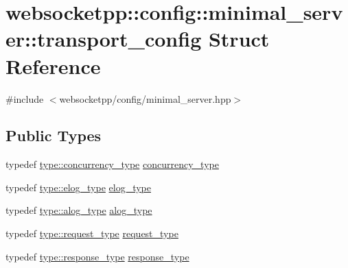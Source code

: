 \hypertarget{structwebsocketpp_1_1config_1_1minimal__server_1_1transport__config}{}\section{websocketpp\+:\+:config\+:\+:minimal\+\_\+server\+:\+:transport\+\_\+config Struct Reference}
\label{structwebsocketpp_1_1config_1_1minimal__server_1_1transport__config}


{\ttfamily \#include $<$websocketpp/config/minimal\+\_\+server.\+hpp$>$}

\subsection*{Public Types}
\begin{DoxyCompactItemize}
\item 
typedef \hyperlink{structwebsocketpp_1_1config_1_1minimal__server_a54e2bde35814bd82607f618aacd3ec88}{type\+::concurrency\+\_\+type} \hyperlink{structwebsocketpp_1_1config_1_1minimal__server_1_1transport__config_a753cbfdd821f9a6643ba8ee70d4834e6}{concurrency\+\_\+type}
\item 
typedef \hyperlink{structwebsocketpp_1_1config_1_1minimal__server_ab8a516661fb2ddd3a3c377823b623c1a}{type\+::elog\+\_\+type} \hyperlink{structwebsocketpp_1_1config_1_1minimal__server_1_1transport__config_a678324060123483e9513cbcd24829cba}{elog\+\_\+type}
\item 
typedef \hyperlink{structwebsocketpp_1_1config_1_1minimal__server_a9296068cfeabe4786e08691cd755f9b3}{type\+::alog\+\_\+type} \hyperlink{structwebsocketpp_1_1config_1_1minimal__server_1_1transport__config_a09acf498effc5c29b26e50a98ce2b8e9}{alog\+\_\+type}
\item 
typedef \hyperlink{structwebsocketpp_1_1config_1_1minimal__server_a7b07ee40c2b25c39fb8e333f969df8e3}{type\+::request\+\_\+type} \hyperlink{structwebsocketpp_1_1config_1_1minimal__server_1_1transport__config_ac45b02a9778ad3371ace822e80d43f8d}{request\+\_\+type}
\item 
typedef \hyperlink{structwebsocketpp_1_1config_1_1minimal__server_a19b0c06176d183a59e47bfe065b132ff}{type\+::response\+\_\+type} \hyperlink{structwebsocketpp_1_1config_1_1minimal__server_1_1transport__config_a5d29cd10696d9a67ad9baf580db6eddf}{response\+\_\+type}
\end{DoxyCompactItemize}
